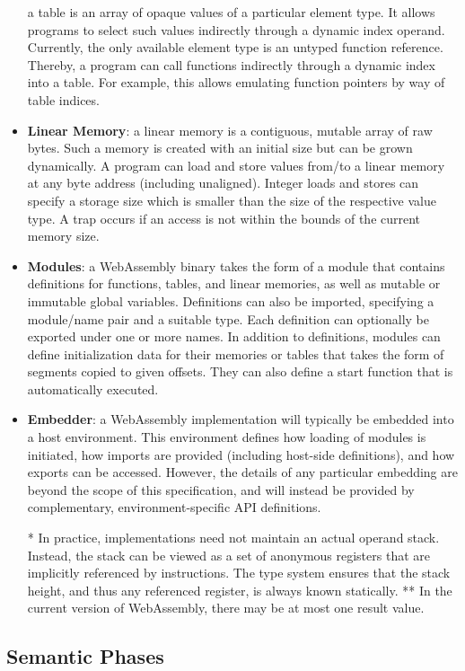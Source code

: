 \begin{itemize}
  a table is an array of opaque values of a particular element type. It allows programs to select such values indirectly through a dynamic index operand. Currently, the only available element type is an untyped function reference. Thereby, a program can call functions indirectly through a dynamic index into a table. For example, this allows emulating function pointers by way of table indices.
  \item \textbf{Linear Memory}:
  a linear memory is a contiguous, mutable array of raw bytes. Such a memory is created with an initial size but can be grown dynamically. A program can load and store values from/to a linear memory at any byte address (including unaligned). Integer loads and stores can specify a storage size which is smaller than the size of the respective value type. A trap occurs if an access is not within the bounds of the current memory size.
  \item \textbf{Modules}:
  a WebAssembly binary takes the form of a module that contains definitions for functions, tables, and linear memories, as well as mutable or immutable global variables. Definitions can also be imported, specifying a module/name pair and a suitable type. Each definition can optionally be exported under one or more names. In addition to definitions, modules can define initialization data for their memories or tables that takes the form of segments copied to given offsets. They can also define a start function that is automatically executed.
  \item \textbf{Embedder}:
  a WebAssembly implementation will typically be embedded into a host environment. This environment defines how loading of modules is initiated, how imports are provided (including host-side definitions), and how exports can be accessed. However, the details of any particular embedding are beyond the scope of this specification, and will instead be provided by complementary, environment-specific API definitions.
  
  *	 In practice, implementations need not maintain an actual operand stack. Instead, the stack can be viewed as a set of anonymous registers that are implicitly referenced by instructions. The type system ensures that the stack height, and thus any referenced register, is always known statically.
  ** In the current version of WebAssembly, there may be at most one result value.
\end{itemize}

\subsection{Semantic Phases} \mbox{}

